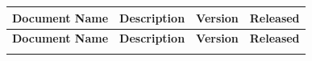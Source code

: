 \begin{longtable}{|l|l|l|l|}
\hline
\begin{minipage}{0.35\linewidth}\raggedright\vspace{.75ex}\textbf{Document Name}\vspace{.75ex}\end{minipage} & \begin{minipage}{0.22\linewidth}\raggedright\vspace{.75ex}\textbf{Description}\vspace{.75ex}\end{minipage} & \begin{minipage}{0.18\linewidth}\raggedright\vspace{.75ex}\textbf{Version}\vspace{.75ex}\end{minipage} & \begin{minipage}{0.13\linewidth}\raggedright\vspace{.75ex}\textbf{Released}\vspace{.75ex}\end{minipage}\\
\hline\hline
\endfirsthead
\hline
\begin{minipage}{0.35\linewidth}\raggedright\vspace{.75ex}\textbf{Document Name}\vspace{.75ex}\end{minipage} & \begin{minipage}{0.22\linewidth}\raggedright\vspace{.75ex}\textbf{Description}\vspace{.75ex}\end{minipage} & \begin{minipage}{0.18\linewidth}\raggedright\vspace{.75ex}\textbf{Version}\vspace{.75ex}\end{minipage} & \begin{minipage}{0.13\linewidth}\raggedright\vspace{.75ex}\textbf{Released}\vspace{.75ex}\end{minipage}\\
\hline\hline
\endhead
\hline
\endfoot
\hline
\endlastfoot

\end{longtable}
